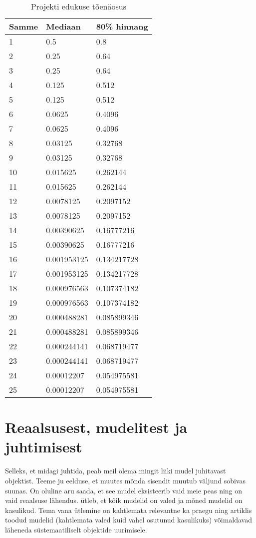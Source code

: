 \begin{table}
	\begin{center}
\begin{tabular}{lll}

\toprule
Samme & Mediaan & 80\% hinnang \\
\midrule
1 & 0.5 & 0.8 \\
2 & 0.25 & 0.64 \\
3 & 0.25 & 0.64 \\
4 & 0.125 & 0.512 \\
5 & 0.125 & 0.512 \\
6 & 0.0625 & 0.4096 \\
7 & 0.0625 & 0.4096 \\
8 & 0.03125 & 0.32768 \\
9 & 0.03125 & 0.32768 \\
10 & 0.015625 & 0.262144 \\
11 & 0.015625 & 0.262144 \\
12 & 0.0078125 & 0.2097152 \\
13 & 0.0078125 & 0.2097152 \\
14 & 0.00390625 & 0.16777216 \\
15 & 0.00390625 & 0.16777216 \\
16 & 0.001953125 & 0.134217728 \\
17 & 0.001953125 & 0.134217728 \\
18 & 0.000976563 & 0.107374182 \\
19 & 0.000976563 & 0.107374182 \\
20 & 0.000488281 & 0.085899346 \\
21 & 0.000488281 & 0.085899346 \\
22 & 0.000244141 & 0.068719477 \\
23 & 0.000244141 & 0.068719477 \\
24 & 0.00012207 & 0.054975581 \\
25 & 0.00012207 & 0.054975581 \\

\bottomrule
\end{tabular}
		\caption{Projekti edukuse tõenäosus}
		\label{tab:success}

	\end{center}
\end{table}

\section{Reaalsusest, mudelitest ja juhtimisest}
Selleks, et midagi juhtida, peab meil olema mingit liiki mudel juhitavast objektist. Teeme ju eelduse, et muutes mõnda sisendit muutub väljund sobivas suunas. On oluline aru saada, et see mudel eksisteerib vaid meie peas ning on vaid reaalsuse lähendus. \citeauthor{box1976science} ütleb, et kõik mudelid on valed ja mõned mudelid on kasulikud\cite{box1976science}. Tema vana ütlemine on kahtlemata relevantne ka praegu ning artiklis toodud mudelid (kahtlemata valed kuid vahel osutunud kasulikuks) võimaldavad läheneda süstemaatiliselt objektide uurimisele. 

